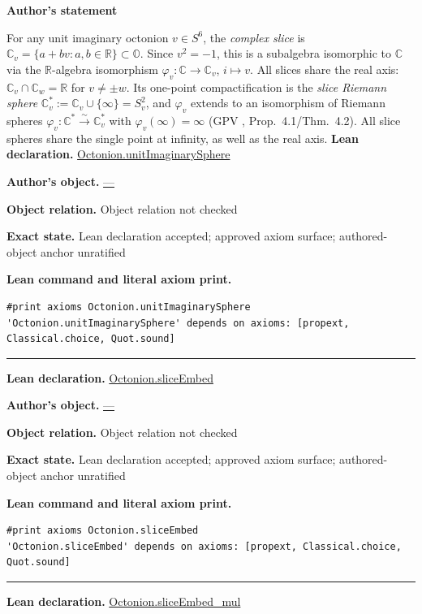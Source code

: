 \documentclass[11pt]{article}
\newcommand{\OO}{\mathbb{O}}
\newcommand{\CC}{\mathbb{C}}
\newcommand{\RR}{\mathbb{R}}
\newcommand{\Cstar}{\CC^{*}}
\theoremstyle{plain}
\theoremstyle{definition}
\theoremstyle{remark}
\begin{document}
\begin{tcolorbox}[provenancecard,title={11. Definition - Complex slices and slice Riemann spheres},title after break={11. Definition - Complex slices and slice Riemann spheres (continued)}]
\textbf{Author's statement}\par
For any unit imaginary octonion $v\in S^6$, the \emph{complex slice} is
$\CC_v=\{a+bv:a,b\in\RR\}\subset\OO$. Since $v^2=-1$, this is a subalgebra isomorphic to
$\CC$ via the $\RR$-algebra isomorphism $\varphi_v:\CC\to\CC_v$, $i\mapsto v$. All slices
share the real axis: $\CC_v\cap\CC_w=\RR$ for $v\neq\pm w$. Its one-point compactification
is the \emph{slice Riemann sphere} $\CC_v^{*}:=\CC_v\cup\{\infty\}=S^2_v$, and $\varphi_v$
extends to an isomorphism of Riemann spheres $\varphi_v:\Cstar\xrightarrow{\sim}\CC_v^{*}$
with $\varphi_v(\infty)=\infty$ (GPV \cite{VS}, Prop.~4.1/Thm.~4.2). All slice spheres
share the single point at infinity, as well as the real axis.
\tcblower
\textbf{Lean declaration.} \url{Octonion.unitImaginarySphere}
\par\textbf{Author's object.} \url{—}
\par\textbf{Object relation.} Object relation not checked
\par\textbf{Exact state.} Lean declaration accepted; approved axiom surface; authored-object anchor unratified
\par\smallskip\textbf{Lean command and literal axiom print.}
\begin{Verbatim}[breaklines=true,breakanywhere=true,fontsize=\small]
#print axioms Octonion.unitImaginarySphere
'Octonion.unitImaginarySphere' depends on axioms: [propext, Classical.choice, Quot.sound]
\end{Verbatim}
\medskip\hrule\medskip
\textbf{Lean declaration.} \url{Octonion.sliceEmbed}
\par\textbf{Author's object.} \url{—}
\par\textbf{Object relation.} Object relation not checked
\par\textbf{Exact state.} Lean declaration accepted; approved axiom surface; authored-object anchor unratified
\par\smallskip\textbf{Lean command and literal axiom print.}
\begin{Verbatim}[breaklines=true,breakanywhere=true,fontsize=\small]
#print axioms Octonion.sliceEmbed
'Octonion.sliceEmbed' depends on axioms: [propext, Classical.choice, Quot.sound]
\end{Verbatim}
\medskip\hrule\medskip
\textbf{Lean declaration.} \url{Octonion.sliceEmbed_mul}

\end{tcolorbox}
\end{document}
